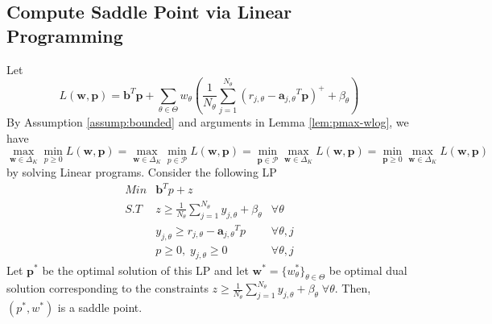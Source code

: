 \documentclass[11pt]{article}
\newcommand{\bb}{\mathbf{b}}
\newcommand{\ba}{\mathbf{a}}
\newcommand{\bp}{\mathbf{p}}
\newcommand{\bw}{\mathbf{w}}
\newcommand{\cP}{\mathcal{P}}
\begin{document}
\subsection{Compute Saddle Point via Linear Programming}
Let 
\begin{equation*}
    L(\bw,\bp) = \bb^T\bp+\sum_{\theta\in\Theta}w_{\theta}\left(\frac{1}{N_{\theta}}\sum_{j=1}^{N_{\theta}}(r_{j,\theta}-{\ba_{j,\theta}}^T\bp)^++\beta_{\theta}\right)
\end{equation*}
By Assumption \ref{assump:bounded} and arguments in Lemma \ref{lem:pmax-wlog}, we have
\begin{equation*}
    \max_{\bw\in\Delta_K}\min_{p\geq 0} L(\bw,\bp)=\max_{\bw\in\Delta_K}\min_{p\in\cP} L(\bw,\bp)=\min_{\bp\in\cP}\max_{\bw\in\Delta_K} L(\bw,\bp)=\min_{\bp\geq 0}\max_{\bw\in\Delta_K} L(\bw,\bp)
\end{equation*}
by solving Linear programs. Consider the following LP
\begin{equation*}
    \begin{array}{lll}
       Min  &  \bb^Tp + z\\
       S.T  &  z\geq \frac{1}{N_{\theta}}\sum_{j=1}^{N_{\theta}}y_{j,\theta} + \beta_{\theta} &\forall\theta\\
       & y_{j,\theta}\geq r_{j,\theta} - {\ba_{j,\theta}}^Tp &\forall \theta,j\\
       & p\geq 0,\;y_{j,\theta}\geq 0 & \forall \theta,j
    \end{array}
\end{equation*}
Let $\bp^*$ be the optimal solution of this LP and let $\bw^{*}=\{w^*_{\theta}\}_{\theta\in\Theta}$ be optimal dual solution corresponding to the constraints $z\geq \frac{1}{N_{\theta}}\sum_{j=1}^{N_{\theta}}y_{j,\theta} + \beta_{\theta} \;\forall\theta$. Then, $(p^*,w^*)$ is a saddle point.
\end{document}
